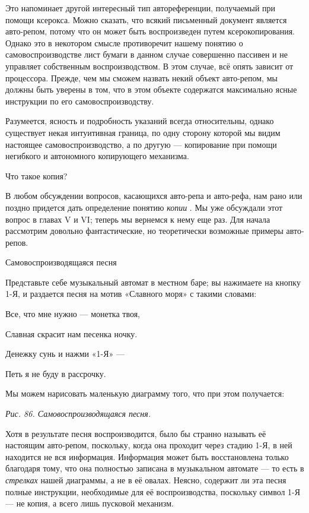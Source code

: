\documentclass[../main.tex]{subfiles}
\begin{document}
Это напоминает другой интересный тип автореференции, получаемый при помощи ксерокса. Можно сказать, что всякий письменный документ является авто-репом, потому что он может быть воспроизведен путем ксерокопирования. Однако это в некотором смысле противоречит нашему понятию о самовоспроизводстве лист бумаги в данном случае совершенно пассивен и не управляет собственным воспроизводством. В этом случае, всё опять зависит от процессора. Прежде, чем мы сможем назвать некий объект авто-репом, мы должны быть уверены в том, что в этом объекте содержатся максимально ясные инструкции по его самовоспроизводству.

Разумеется, ясность и подробность указаний всегда относительны, однако существует некая интуитивная граница, по одну сторону которой мы видим настоящее самовоспроизводство, а по другую --- копирование при помощи негибкого и автономного копирующего механизма.

Что такое копия?

В любом обсуждении вопросов, касающихся авто-репа и авто-рефа, нам рано или поздно придется дать определение понятию \emph{копии} . Мы уже обсуждали этот вопрос в главах V и VI; теперь мы вернемся к нему еще раз. Для начала рассмотрим довольно фантастические, но теоретически возможные примеры авто-репов.

Самовоспроизводящаяся песня

Представьте себе музыкальный автомат в местном баре; вы нажимаете на кнопку 1-Я, и раздается песня на мотив «Славного моря» с такими словами:

Все, что мне нужно --- монетка твоя,

Славная скрасит нам песенка ночку.

Денежку сунь и нажми «1-Я» ---

Петь я не буду в рассрочку.

Мы можем нарисовать маленькую диаграмму того, что при этом получается:

\emph{Рис. 86. Самовоспроизводящаяся песня.}

Хотя в результате песня воспроизводится, было бы странно называть её настоящим авто-репом, поскольку, когда она проходит через стадию 1-Я, в ней находится не вся информация. Информация может быть восстановлена только благодаря тому, что она полностью записана в музыкальном автомате --- то есть в \emph{стрелках} нашей диаграммы, а не в её овалах. Неясно, содержит ли эта песня полные инструкции, необходимые для её воспроизводства, поскольку символ 1-Я --- не копия, а всего лишь пусковой механизм.
\end{document}
